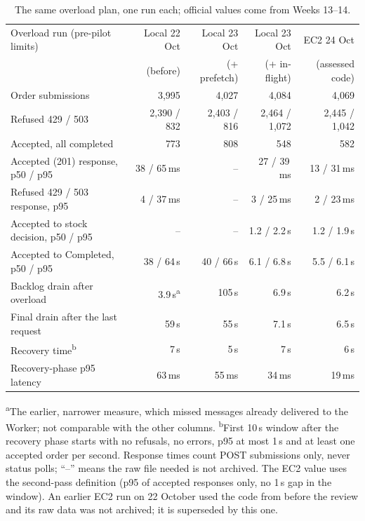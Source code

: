\documentclass[12pt,a4paper]{article}
\begin{document}
\begin{table}[htbp]
\centering\small
\setlength{\tabcolsep}{4pt}
\caption{The same overload plan, one run each; official values come from Weeks 13--14.}
\label{tab:overload}
\begin{tabularx}{\textwidth}{Yrrrr}
\toprule
Overload run (pre-pilot limits) & Local 22 Oct & Local 23 Oct & Local 23 Oct & EC2 24 Oct \\
 & (before) & (+ prefetch) & (+ in-flight) & (assessed code) \\
\midrule
Order submissions & 3,995 & 4,027 & 4,084 & 4,069 \\
Refused 429 / 503 & 2,390 / 832 & 2,403 / 816 & 2,464 / 1,072 & 2,445 / 1,042 \\
Accepted, all completed & 773 & 808 & 548 & 582 \\
Accepted (201) response, p50 / p95 & 38 / 65\,ms & -- & 27 / 39\,ms & 13 / 31\,ms \\
Refused 429 / 503 response, p95 & 4 / 37\,ms & -- & 3 / 25\,ms & 2 / 23\,ms \\
Accepted to stock decision, p50 / p95 & -- & -- & 1.2 / 2.2\,s & 1.2 / 1.9\,s \\
Accepted to Completed, p50 / p95 & 38 / 64\,s & 40 / 66\,s & 6.1 / 6.8\,s & 5.5 / 6.1\,s \\
Backlog drain after overload & 3.9\,s\textsuperscript{a} & 105\,s & 6.9\,s & 6.2\,s \\
Final drain after the last request & 59\,s & 55\,s & 7.1\,s & 6.5\,s \\
Recovery time\textsuperscript{b} & 7\,s & 5\,s & 7\,s & 6\,s \\
Recovery-phase p95 latency & 63\,ms & 55\,ms & 34\,ms & 19\,ms \\
\bottomrule
\end{tabularx}
\par\smallskip
{\footnotesize\raggedright \textsuperscript{a}The earlier, narrower measure,
which missed messages already delivered to the Worker; not comparable with the
other columns. \textsuperscript{b}First 10\,s window after the recovery phase
starts with no refusals, no errors, p95 at most 1\,s and at least one accepted
order per second. Response times count POST submissions only, never status
polls; ``--'' means the raw file needed is not archived. The EC2 value uses
the second-pass definition (p95 of accepted responses only, no 1\,s gap in
the window). An earlier EC2 run on 22 October used the code from before the
review and its raw data was not archived; it is superseded by this one.\par}
\end{table}
\end{document}
